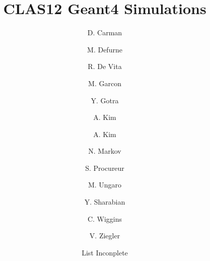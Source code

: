 \title{CLAS12 Geant4 Simulations}




\author[C]{D. Carman}
\author[C]{M. Defurne}
\author[B]{R. De Vita}
\author[C]{M. Garcon}
\author[A]{Y. Gotra}
\author[D]{A. Kim}
\author[D]{A. Kim}
\author[C]{N. Markov}
\author[C]{S. Procureur}
\author[A]{M. Ungaro}
\author[A]{Y. Sharabian}
\author[A]{C. Wiggins}
\author[A]{V. Ziegler}
\author[A]{List Inconplete}

\address[A]{Thomas Jefferson National Accelerator Facility, Newport News, VA, USA}
\address[B]{Istituto Nazionale Di Fisica Nucleare, Genova, Italy}
\address[C]{IRFU, CEA, Universit\`e Paris-Saclay, F-91191 Gif-sur-Yvette, France}
\address[D]{University of Connecticut, Storrs, Connecticut}
